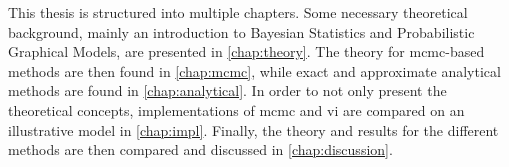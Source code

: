 This thesis is structured into multiple chapters. Some necessary theoretical background, mainly an introduction to Bayesian Statistics and Probabilistic Graphical Models, are presented in \cref{chap:theory}. The theory for \acrshort{mcmc}-based methods are then found in \cref{chap:mcmc}, while exact and approximate analytical methods are found in \cref{chap:analytical}. In order to not only present the theoretical concepts, implementations of \acrshort{mcmc} and \acrshort{vi} are compared on an illustrative model in \cref{chap:impl}. Finally, the theory and results for the different methods are then compared and discussed in \cref{chap:discussion}.